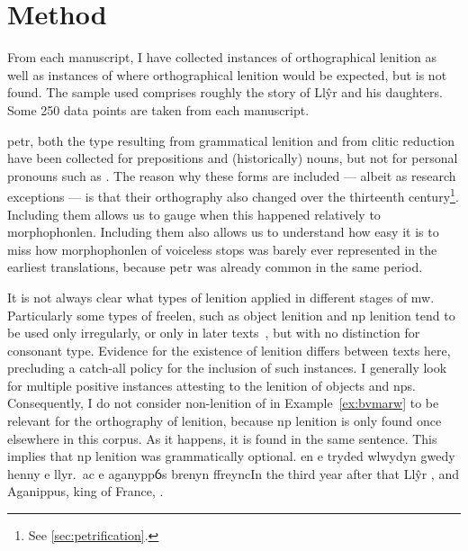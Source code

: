 \section{Method}
\label{sec:method}
From each manuscript, I have collected instances of orthographical
lenition as well as instances of where orthographical lenition would
be expected, but is not found. The sample used comprises roughly the
story of Llŷr and his daughters.  Some 250 data points are taken
from each manuscript.

\Gls{petr}, both the type resulting from grammatical lenition and from clitic reduction have been collected for prepositions
and (historically) nouns, but not for personal pronouns such
as . The reason why these forms are included --- albeit
as research exceptions --- is that their orthography also changed over the
thirteenth century\footnote{See \ref{sec:petrification}.}. Including them allows
us to gauge when this happened relatively to \gls{morphophonlen}.
Including them also allows us to understand how easy it is to miss how \gls{morphophonlen} of voiceless stops was barely ever represented in the earliest translations, because \gls{petr} was already common in the same period.

It is not always clear what types of lenition applied in different
stages of \gls{mw}. Particularly some types of \gls{freelen},
such as object lenition and \gls{np} lenition tend to be used only irregularly,
or only in later texts~\autocite{van_development14}, but
with no distinction for consonant type. Evidence for the existence of
lenition differs between texts here, precluding a catch-all policy for
the inclusion of such instances. I generally look for multiple positive
instances attesting to the lenition of objects and \gls{np}s.
Consequently, I do not consider non-lenition of  in
Example~\ref{ex:bvmarw} to be relevant for the orthography of lenition,
because \gls{np} lenition is only found once elsewhere in this corpus.
As it happens, it is found in the same sentence.
This implies that \gls{np} lenition was grammatically optional.
{en e tryded wlwydyn gwedy henny e  llyr.\ ac e  aganyppỽs brenyn ffreync}{In the third year after that Llŷr , and Aganippus, king of France, .}


